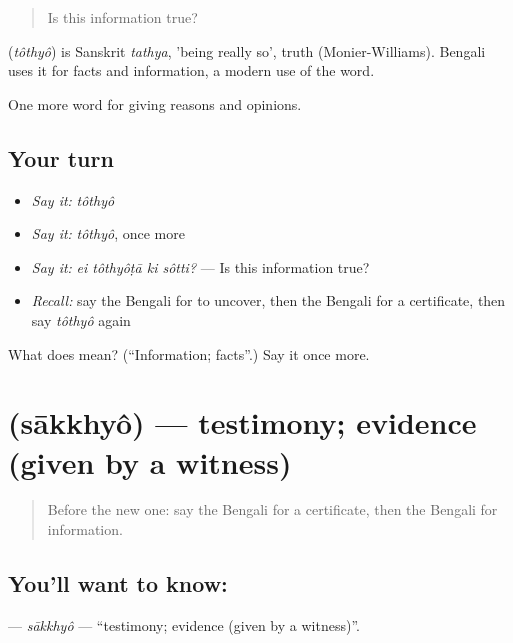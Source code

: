 \begin{quote}
Is this information true?
\end{quote}

\begin{cousinweb}
\textbf{} (\emph{tôthyô}) is Sanskrit \emph{tathya}, 'being really so', truth (Monier-Williams). Bengali uses it for facts and information, a modern use of the word.
\end{cousinweb}

\begin{grammarlens}[title={What you've built}]
One more word for giving reasons and opinions.
\end{grammarlens}

\subsection*{Your turn}
\begin{itemize}
\raggedright
  \item \emph{Say it:} \emph{tôthyô}
  \item \emph{Say it:} \emph{tôthyô}, once more
  \item \emph{Say it:} \emph{ei tôthyôṭā ki sôtti?} — Is this information true?
  \item \emph{Recall:} say the Bengali for to uncover, then the Bengali for a certificate, then say \emph{tôthyô} again
\end{itemize}

\begin{tcolorbox}[breakable,colback=teal!4,colframe=teal!35!black,title={Before you move on}]
What does  mean? (\textquotedblleft{}Information; facts\textquotedblright{}.) Say it once more.
\end{tcolorbox}
\section[\texorpdfstring{\bn{সাক্ষ্য} (sākkhyô)}{সাক্ষ্য (sākkhyô)}]{ (sākkhyô) — testimony; evidence (given by a witness)}

\label{lesson:BN-C338-sakkhyo}



\begin{quote}
Before the new one: say the Bengali for a certificate, then the Bengali for information.
\end{quote}

\subsection*{You'll want to know: }
\textbf{} — \emph{sākkhyô} — \textquotedblleft{}testimony; evidence (given by a witness)\textquotedblright{}.

